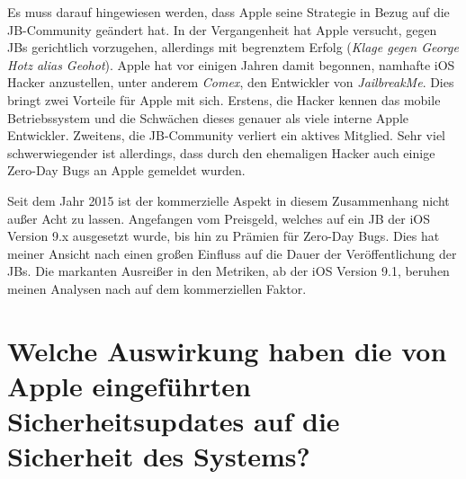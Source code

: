 Es muss darauf hingewiesen werden, dass Apple seine Strategie in Bezug auf die JB-Community geändert hat. In der Vergangenheit hat Apple versucht, gegen JBs gerichtlich vorzugehen, allerdings mit begrenztem Erfolg (\textit{\glqq Klage gegen George Hotz alias Geohot\grqq{}}). Apple hat vor einigen Jahren damit begonnen, namhafte iOS Hacker anzustellen, unter anderem \textit{\glqq Comex\grqq}, den Entwickler von \textit{\glqq JailbreakMe\grqq}. Dies bringt zwei Vorteile für Apple mit sich. Erstens, die Hacker kennen das mobile Betriebssystem und die Schwächen dieses genauer als viele interne Apple Entwickler.  Zweitens, die JB-Community verliert ein aktives Mitglied. Sehr viel schwerwiegender ist allerdings, dass durch den ehemaligen Hacker auch einige Zero-Day Bugs an Apple gemeldet wurden.\par
Seit dem Jahr 2015 ist der kommerzielle Aspekt in diesem Zusammenhang nicht außer Acht zu lassen. Angefangen vom Preisgeld, welches auf ein JB der iOS Version 9.x ausgesetzt wurde, bis hin zu Prämien für Zero-Day Bugs. Dies hat meiner Ansicht nach einen großen Einfluss auf die Dauer der Veröffentlichung der JBs. Die markanten Ausreißer in den Metriken, ab der iOS Version 9.1, beruhen meinen Analysen nach auf dem kommerziellen Faktor. 
\section{Welche Auswirkung haben die von Apple eingeführten Sicherheitsupdates auf die Sicherheit des Systems?}
\label{sec:Frage2}
% 

